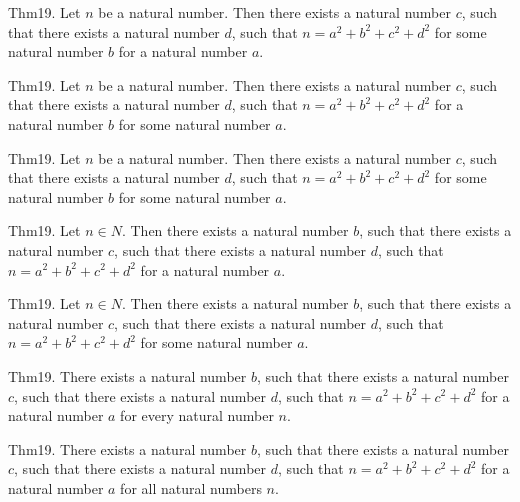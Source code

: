 \documentclass{article}
\begin{document}
Thm19. Let $n$ be a natural number. Then there exists a natural number $c$, such that there exists a natural number $d$, such that $n = a ^{ 2}+ b ^{ 2}+ c ^{ 2}+ d ^{ 2}$ for some natural number $b$ for a natural number $a$.

Thm19. Let $n$ be a natural number. Then there exists a natural number $c$, such that there exists a natural number $d$, such that $n = a ^{ 2}+ b ^{ 2}+ c ^{ 2}+ d ^{ 2}$ for a natural number $b$ for some natural number $a$.

Thm19. Let $n$ be a natural number. Then there exists a natural number $c$, such that there exists a natural number $d$, such that $n = a ^{ 2}+ b ^{ 2}+ c ^{ 2}+ d ^{ 2}$ for some natural number $b$ for some natural number $a$.

Thm19. Let $n \in N$. Then there exists a natural number $b$, such that there exists a natural number $c$, such that there exists a natural number $d$, such that $n = a ^{ 2}+ b ^{ 2}+ c ^{ 2}+ d ^{ 2}$ for a natural number $a$.

Thm19. Let $n \in N$. Then there exists a natural number $b$, such that there exists a natural number $c$, such that there exists a natural number $d$, such that $n = a ^{ 2}+ b ^{ 2}+ c ^{ 2}+ d ^{ 2}$ for some natural number $a$.

Thm19. There exists a natural number $b$, such that there exists a natural number $c$, such that there exists a natural number $d$, such that $n = a ^{ 2}+ b ^{ 2}+ c ^{ 2}+ d ^{ 2}$ for a natural number $a$ for every natural number $n$.

Thm19. There exists a natural number $b$, such that there exists a natural number $c$, such that there exists a natural number $d$, such that $n = a ^{ 2}+ b ^{ 2}+ c ^{ 2}+ d ^{ 2}$ for a natural number $a$ for all natural numbers $n$.
\end{document}
